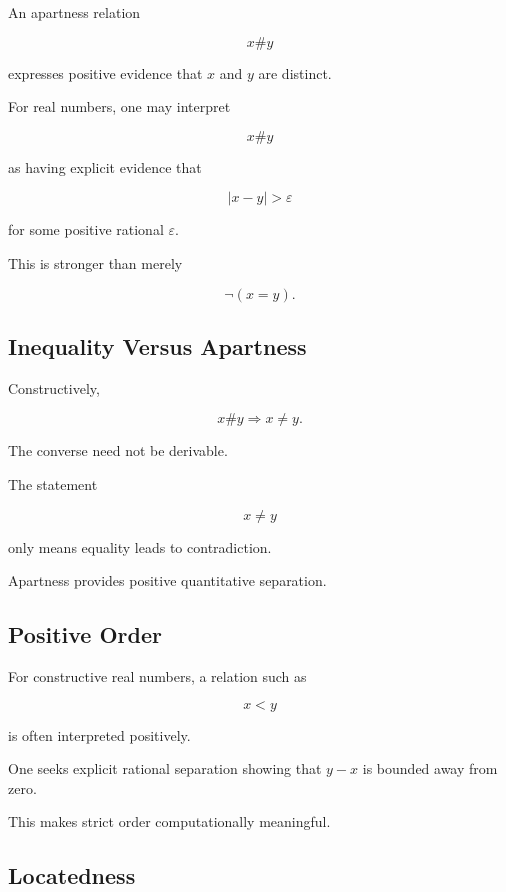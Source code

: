 An apartness relation

\[
\boxed{
x\# y
}
\]

expresses positive evidence that \(x\) and \(y\) are distinct.

For real numbers, one may interpret

\[
x\# y
\]

as having explicit evidence that

\[
\boxed{
|x-y|>\varepsilon
}
\]

for some positive rational \(\varepsilon\).

This is stronger than merely

\[
\neg(x=y).
\]

\subsection{Inequality Versus Apartness}
\label{subsec:inequality-versus-apartness}

Constructively,

\[
\boxed{
x\# y
\Longrightarrow
x\neq y.
}
\]

The converse need not be derivable.

The statement

\[
x\neq y
\]

only means equality leads to contradiction.

Apartness provides positive quantitative separation.

\subsection{Positive Order}
\label{subsec:constructive-positive-order}

For constructive real numbers, a relation such as

\[
x<y
\]

is often interpreted positively.

One seeks explicit rational separation showing that \(y-x\) is bounded
away from zero.

This makes strict order computationally meaningful.

\subsection{Locatedness}
\label{subsec:locatedness}

